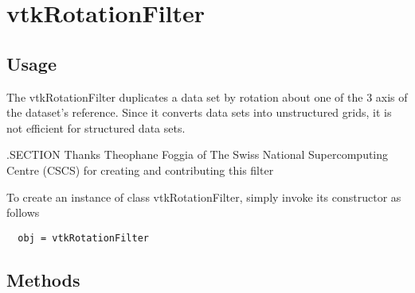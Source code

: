 \section{vtkRotationFilter}

\subsection{Usage}

 The vtkRotationFilter duplicates a data set by rotation about one of the
 3 axis of the dataset's reference.
 Since it converts data sets into unstructured grids, it is not efficient
 for structured data sets.

 .SECTION Thanks
 Theophane Foggia of The Swiss National Supercomputing Centre (CSCS)
 for creating and contributing this filter

To create an instance of class vtkRotationFilter, simply
invoke its constructor as follows
\begin{verbatim}
  obj = vtkRotationFilter
\end{verbatim}
\subsection{Methods}

